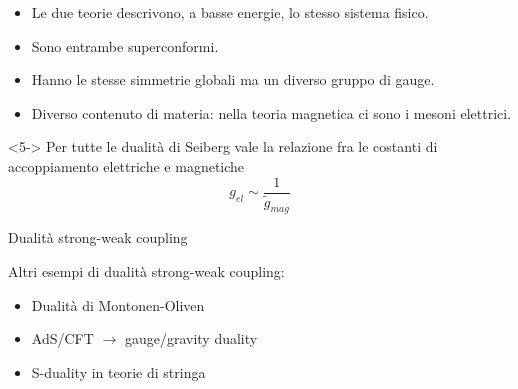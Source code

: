 \documentclass[10pt,compress]{beamer}
\begin{document}
\begin{frame}

	\begin{itemize}
\item<1->	Le due teorie descrivono, a basse energie, lo stesso sistema fisico.\\
\item<2->	Sono entrambe superconformi.
\item <3-> Hanno le stesse simmetrie globali ma un diverso gruppo di gauge.
\item <4->Diverso contenuto di materia: nella teoria magnetica ci sono i mesoni elettrici.
	\end{itemize}
\vspace{0.5cm}
\begin{block}{}<5->
Per tutte le dualità di Seiberg vale la relazione fra le costanti di accoppiamento elettriche e magnetiche
 $$
  g_{el} \sim \frac{1}{\tilde{g}_{mag}} 
$$
\end{block}


\end{frame}




\begin{frame}{Dualità strong-weak coupling}

\vspace{0.5cm}

Altri esempi di dualità strong-weak coupling:
\begin{itemize}
\item Dualità di Montonen-Oliven
\item AdS/CFT $\rightarrow$ gauge/gravity duality 
\item S-duality in teorie di stringa
\end{itemize}

\end{frame}
\end{document}
